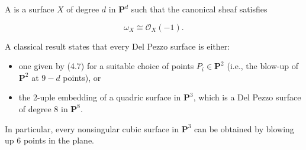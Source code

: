 A  is a surface $X$ of degree $d$ in $\mathbf{P}^d$ such that the canonical sheaf satisfies

$$\omega_X \cong \mathcal{O}_X(-1).$$

A classical result states that every Del Pezzo surface is either:
\begin{itemize}
\item one given by (4.7) for a suitable choice of points $P_i \in \mathbf{P}^2$ (i.e., the blow-up of $\mathbf{P}^2$ at $9-d$ points), or
\item the 2-uple embedding of a quadric surface in $\mathbf{P}^3$, which is a Del Pezzo surface of degree 8 in $\mathbf{P}^8$.
\end{itemize}
In particular, every nonsingular cubic surface in $\mathbf{P}^3$ can be obtained by blowing up 6 points in the plane.
